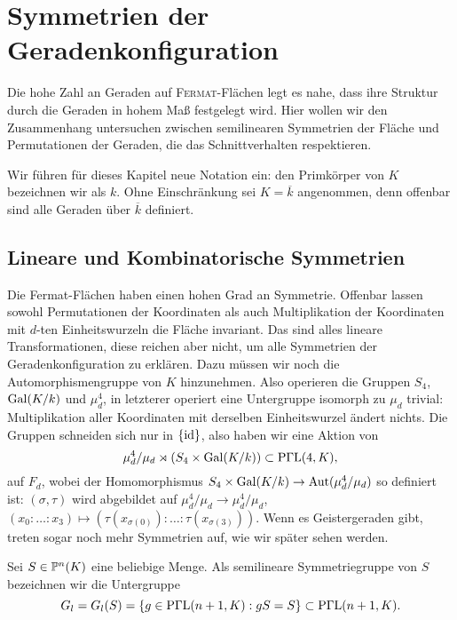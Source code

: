 \chapter{Symmetrien der Geradenkonfiguration} \label{chap:configsymm}
Die hohe Zahl an Geraden auf \textsc{Fermat}-Flächen legt es nahe, dass ihre Struktur durch die Geraden in hohem Maß festgelegt wird. Hier wollen wir den Zusammenhang untersuchen zwischen semilinearen Symmetrien der Fläche und Permutationen der Geraden, die das Schnittverhalten respektieren.

Wir führen für dieses Kapitel neue Notation ein: den Primkörper von $K$ bezeichnen wir als $k$. Ohne Einschränkung sei $K = \overline k$ angenommen, denn offenbar sind alle Geraden über $\overline k$ definiert.

\section{Lineare und Kombinatorische Symmetrien}
Die Fermat-Flächen haben einen hohen Grad an Symmetrie. Offenbar lassen sowohl Permutationen der Koordinaten als auch Multiplikation der Koordinaten mit $d$-ten Einheitswurzeln die Fläche invariant. Das sind alles lineare Transformationen, diese reichen aber nicht, um alle Symmetrien der Geradenkonfiguration zu erklären. Dazu müssen wir noch die Automorphismengruppe von $K$ hinzunehmen. Also operieren die Gruppen $S_4$, $\Gal K/k$ und $\mu_d^4$, in letzterer operiert eine Untergruppe isomorph zu $\mu_d$ trivial: Multiplikation aller Koordinaten mit derselben Einheitswurzel ändert nichts. Die Gruppen schneiden sich nur in $\{\operatorname{id}\}$, also haben wir eine Aktion von
\begin{equation}
\mu_d^4 / \mu_d \rtimes (S_4 \times \Gal K/k) \subset \PGaL 4K,
\end{equation}
auf $F_d$, wobei der Homomorphismus $S_4 \times \Gal K/k \rightarrow \Aut(\mu_d^4 / \mu_d)$ so definiert ist: $(\sigma, \tau)$ wird abgebildet auf $\mu_d^4 / \mu_d \to \mu_d^4 / \mu_d$, $(x_0:\dots:x_3) \mapsto (\tau(x_{\sigma(0)}):\dots:\tau(x_{\sigma(3)}))$. Wenn es Geistergeraden gibt, treten sogar noch mehr Symmetrien auf, wie wir später sehen werden.

\begin{defin}
Sei $S \in \mathbb P^{n}(K)$ eine beliebige Menge. Als semilineare Symmetriegruppe von $S$ bezeichnen wir die Untergruppe
\begin{equation}
G_l = G_l(S) = \{ g \in \mathrm{P\Gamma L}(n+1,K): gS = S \} \subset \mathrm{P\Gamma L}(n+1,K).
\end{equation}
\end{defin}

